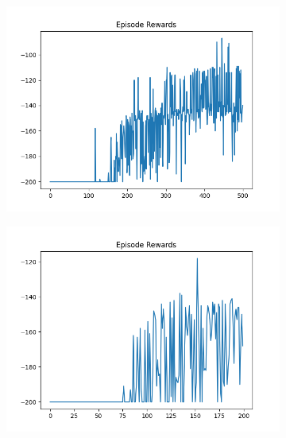 \begin{figure}[H]
    \centering
    \begin{subfigure}{.47\linewidth}
        \centering
        \includegraphics[width=\textwidth]{mountain/2024-06-15_13-00-05_dqn_mountaincar_episode_rewards.png}
    \end{subfigure}
    \begin{subfigure}{.47\linewidth}
        \centering
        \includegraphics[width=\textwidth]{mountain/2024-06-15_13-45-28_dqn_mountaincar_episode_rewards.png}
    \end{subfigure}
    \begin{subfigure}{.47\linewidth}
        \centering

\end{subfigure}
\end{figure}
